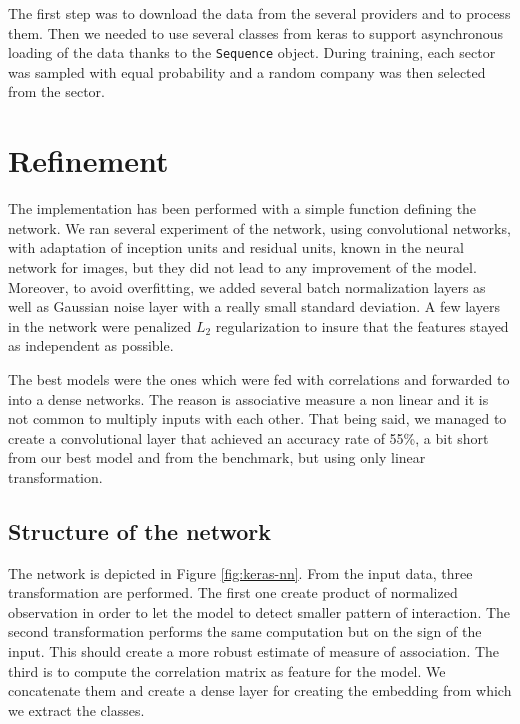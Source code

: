 \documentclass[a4paper,twoside]{article}
\begin{document}
The first step was to download the data from the several providers and to
process them. Then we needed to use several classes from keras to support
asynchronous loading of the data thanks to the \texttt{Sequence} object. During
training, each sector was sampled with equal probability and a random
company was then selected from the sector.

\section{Refinement}
\label{sec:org7f8f4d9}

The implementation has been performed with a simple function defining the
network. We ran several experiment of the network, using convolutional
networks, with adaptation of inception units and residual units, known in the
neural network for images, but they did not lead to any improvement of the
model. Moreover, to avoid overfitting, we added several batch normalization
layers as well as Gaussian noise layer with a really small standard deviation.
A few layers in the network were penalized \(L_2\) regularization to insure that
the features stayed as independent as possible.

The best models were the ones which were fed with correlations and forwarded
to into a dense networks. The reason is associative measure a non linear and
it is not common to multiply inputs with each other. That being said, we
managed to create a convolutional layer that achieved an accuracy rate of
55\%, a bit short from our best model and from the benchmark, but using only
linear transformation.


\subsection{Structure of the network}
\label{sec:orgcc626c2}

The network is depicted in Figure \ref{fig:keras-nn}. From the input data,
three transformation are performed. The first one create product of
normalized observation in order to let the model to detect smaller pattern of
interaction. The second transformation performs the same computation but on
the sign of the input. This should create a more robust estimate of measure
of association. The third is to compute the correlation matrix as feature for
the model. We concatenate them and create a dense layer for creating the
embedding from which we extract the classes.
\end{document}
